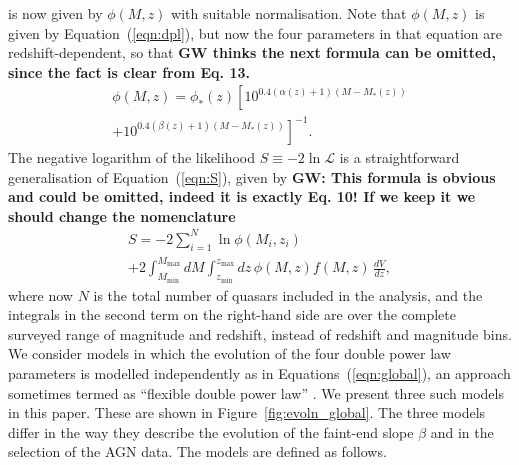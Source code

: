 \documentclass[fleqn,usenatbib]{mnras}
\begin{document}
is now given by $\phi(M,z)$ with suitable normalisation.  Note that
$\phi(M,z)$ is given by Equation~(\ref{eqn:dpl}), but now the four
parameters in that equation are redshift-dependent, so that
\textbf{GW thinks the next formula can be omitted, since the fact is clear from Eq. 13.}
\begin{multline}
  \phi(M,z) = \phi_*(z) \left[10^{0.4(\alpha(z)+1)(M-M_*(z))}\right. \\ \left.+ 10^{0.4(\beta(z)+1)(M-M_*(z))}\right]^{-1}.
\end{multline}
The negative logarithm of the likelihood $S\equiv -2\ln\mathcal{L}$ is
a straightforward generalisation of Equation~(\ref{eqn:S}), given by
\textbf{GW: This formula is obvious and could be omitted, indeed it is exactly Eq. 10! If we keep it we should change the nomenclature}
\begin{multline}
  S = -2\sum_{i=1}^N\ln\phi(M_i, z_i)\\+2\int_{M_\mathrm{min}}^{M_\mathrm{max}}dM\int_{z_\mathrm{min}}^{z_\mathrm{max}}dz\, \phi(M,z) f(M, z)\,\frac{dV}{dz},
  \label{eqn:S2}
\end{multline}
where now $N$ is the total number of quasars included in the analysis,
and the integrals in the second term on the right-hand side are over
the complete surveyed range of magnitude and redshift, instead of
redshift and magnitude bins.  We consider models in which the
evolution of the four double power law parameters is modelled
independently as in Equations~(\ref{eqn:global}), an approach
sometimes termed as ``flexible double power law''
\citep{2015MNRAS.451.1892A}.  We present three such models in this
paper.  These are shown in Figure~\ref{fig:evoln_global}.
The three
models differ in the way they describe the evolution of the faint-end
slope $\beta$ and in the selection of the AGN data.  The models are
defined as follows.
\end{document}
